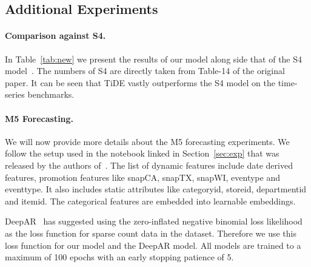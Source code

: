 \documentclass[10pt]{article} \usepackage[accepted]{tmlr}
\theoremstyle{plain}
\theoremstyle{definition}
\theoremstyle{remark}
\newcommand{\rev}[1]{#1}
\begin{document}
\subsection{Additional Experiments}
\rev{
\paragraph{Comparison against S4.} In Table~\ref{tab:new} we present the results of our model along side that of the S4 model~\citep{guefficiently}. The numbers of S4 are directly taken from Table-14 of the original paper. It can be seen that TiDE vastly outperforms the S4 model on the time-series benchmarks.

\paragraph{M5 Forecasting.} We will now provide more details about the M5 forecasting experiments. We follow the setup used in the notebook linked in Section~\ref{sec:exp} that was released by the authors of~\citep{alexandrov2020gluonts}. The list of dynamic features include date derived features, promotion features like snap\textunderscore CA, snap\textunderscore TX, snap\textunderscore WI, even\textunderscore type\textunderscore 1 and event\textunderscore type\textunderscore 2. It also includes static attributes like category\textunderscore id, store\textunderscore id, department\textunderscore id and item\textunderscore id. The categorical features are embedded into learnable embeddings. 

DeepAR~\citep{salinas2020deepar} has suggested using the zero-inflated negative binomial loss likelihood as the loss function for sparse count data in the dataset. Therefore we use this loss function for our model and the DeepAR model. All models are trained to a maximum of 100 epochs with an early stopping patience of 5.
}
\end{document}

